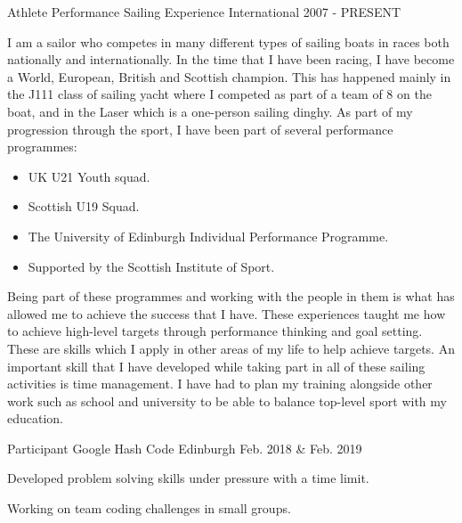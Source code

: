 

\begin{cventries}

    
  \cventry
    {Athlete} %
    {Performance Sailing Experience} %
    {International} %
    {2007 - PRESENT} %
    {
      I am a sailor who competes in many different types of sailing boats in races both nationally and internationally. In the time that I have been racing, I have become a World, European, British and Scottish champion. This has happened mainly in the J111 class of sailing yacht where I competed as part of a team of 8 on the boat, and in the Laser which is a one-person sailing dinghy. As part of my progression through the sport, I have been part of several performance programmes:
      \begin{itemize}
          \item UK U21 Youth squad.
          \item Scottish U19 Squad.
          \item The University of Edinburgh Individual Performance Programme.
          \item Supported by the Scottish Institute of Sport.
      \end{itemize}
      Being part of these programmes and working with the people in them is what has allowed me to achieve the success that I have. These experiences taught me how to achieve high-level targets through performance thinking and goal setting. These are skills which I apply in other areas of my life to help achieve targets. An important skill that I have developed while taking part in all of these sailing activities is time management. I have had to plan my training alongside other work such as school and university to be able to balance top-level sport with my education.
    }

  \cventry
    {Participant} %
    {Google Hash Code} %
    {Edinburgh} %
    {Feb. 2018 \& Feb. 2019} %
    {
      \begin{cvitems} %
        \item {Developed problem solving skills under pressure with a time limit.}
        \item {Working on team coding challenges in small groups.}
      \end{cvitems}
    }


\end{cventries}
